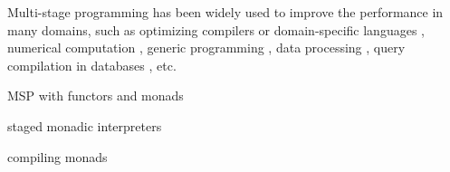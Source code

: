 Multi-stage programming has been widely used to improve the performance in many
domains, such as optimizing compilers or domain-specific languages
\cite{DBLP:conf/pldi/RompfSBLCO14, DBLP:conf/snapl/RompfBLSJAOSKDK15,
DBLP:journals/tecs/SujeethBLRCOO14, DBLP:conf/gpce/SujeethGBLROO13,
DBLP:journals/jfp/CaretteKS09}, numerical computation \cite{PGL-038,
DBLP:conf/pepm/AktemurKKS13}, generic programming
\cite{DBLP:journals/pacmpl/Yallop17, Ofenbeck:2017:SGP:3136040.3136060}, data
processing \cite{DBLP:conf/oopsla/JonnalageddaCSRO14,
DBLP:conf/popl/KiselyovBPS17}, query compilation in databases
\cite{DBLP:conf/osdi/EssertelTDBOR18, DBLP:conf/sigmod/TahboubER18}, etc.

MSP with functors and monads \cite{10.1007/11561347_18}

staged monadic interpreters \cite{DBLP:conf/dsl/SheardBP99}

compiling monads \cite{danvy1991compiling}
